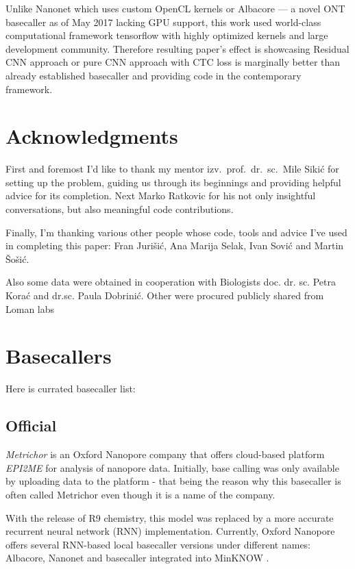 \documentclass[runningheads,a4paper]{llncs}
\begin{document}
Unlike Nanonet which uses custom OpenCL kernels or Albacore --- a novel ONT basecaller as of May 2017 lacking GPU support, this work used world-class computational framework tensorflow with highly optimized kernels and large development community. Therefore resulting paper's effect is showcasing Residual CNN approach or pure CNN approach with CTC loss is marginally better than already established basecaller and providing code in the contemporary framework.

\section{Acknowledgments}

First and foremost I'd like to thank my mentor izv.~prof.~dr.~sc.~Mile Sikić for setting up the problem, guiding us through its beginnings and providing helpful advice for its completion. Next Marko Ratkovic for his not only insightful conversations, but also meaningful code contributions.

Finally, I'm thanking various other people whose code, tools and advice I've used in completing this paper: Fran Jurišić, Ana Marija Selak, Ivan Sović and Martin Šošić.

Also some data were obtained in cooperation with Biologists doc. dr. sc. Petra Korać and dr.sc. Paula Dobrinić. Other were procured publicly shared from Loman labs~\cite{loman1-100k}



\appendix
\section{Basecallers}\label{app:basecallers}
Here is currated basecaller list:

\subsection{Official}
\textit{Metrichor} is an Oxford Nanopore company that offers cloud-based platform \textit{EPI2ME} for analysis of nanopore data.
Initially, base calling was only available by uploading data to the platform - that being the reason why this basecaller is often called Metrichor even though it is a name of the company.

With the release of R9 chemistry, this model was replaced by a more accurate recurrent neural network (RNN) implementation. Currently, Oxford Nanopore offers several RNN-based local basecaller versions under different names: Albacore, Nanonet and basecaller integrated into MinKNOW \cite{ont-basecallers}.
\end{document}

